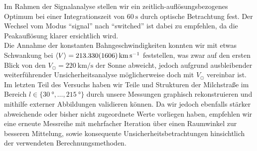 \documentclass[../main.tex]{subfiles}
\begin{document}
    Im Rahmen der Signalanalyse stellen wir ein zeitlich-auflösungsbezogenes Optimum bei einer Integrationszeit von $\SI{60}{\s}$ durch optische Betrachtung fest. Der Wechsel vom Modus \enquote{signal} nach \enquote{switched} ist dabei zu empfehlen, da die Peakauflösung klarer ersichtlich wird. \\ 

    Die Annahme der konstanten Bahngeschwindigkeiten konnten wir mit etwas Schwankung bei $\langle V\rangle = \SI{213.33\pm1.606}{\km\per\s}$ feststellen, was zwar auf den ersten Blick von den $V_\odot = \SI{220}{\km\per\s}$ der Sonne abweicht, jedoch aufgrund ausbleibender weiterführender Unsicherheitsanalyse möglicherweise doch mit $V_\odot$ vereinbar ist. \\

    Im letzten Teil des Versuchs haben wir Teile und Strukturen der Milchstraße im Bereich $l\in\{\SI{30}{\degree},\ldots,\SI{215}{\degree}\}$ durch unsere Messungen graphisch rekonstruieren und mithilfe externer Abbildungen validieren können. Da wir jedoch ebenfalls stärker abweichende oder bisher nicht zugeordnete Werte vorliegen haben, empfehlen wir eine erneute Messreihe mit mehrfacher Iteration über einen Raumwinkel zur besseren Mittelung, sowie konsequente Unsicherheitsbetrachtungen hinsichtlich der verwendeten Berechnungsmethoden.   
\end{document}
